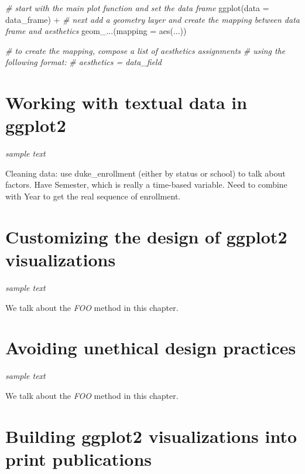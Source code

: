 \documentclass[
]{krantz}
\makeatletter
\newenvironment{Shaded}{\begin{snugshade}}{\end{snugshade}}
\newcommand{\AttributeTok}[1]{\textcolor[rgb]{0.61,0.61,0.61}{#1}}
\newcommand{\CommentTok}[1]{\textcolor[rgb]{0.37,0.37,0.37}{\textit{#1}}}
\newcommand{\FunctionTok}[1]{\textcolor[rgb]{0,0,0}{#1}}
\newcommand{\NormalTok}[1]{#1}
\newcommand{\SpecialCharTok}[1]{\textcolor[rgb]{0,0,0}{#1}}
\newenvironment{kframe}{%
\medskip{}
\setlength{\fboxsep}{.8em}
 \def\at@end@of@kframe{}%
 \ifinner\ifhmode%
  \def\at@end@of@kframe{\end{minipage}}%
  \begin{minipage}{\columnwidth}%
 \fi\fi%
 \def\FrameCommand##1{\hskip\@totalleftmargin \hskip-\fboxsep
 \colorbox{shadecolor}{##1}\hskip-\fboxsep
     \hskip-\linewidth \hskip-\@totalleftmargin \hskip\columnwidth}%
 \MakeFramed {\advance\hsize-\width
   \@totalleftmargin\z@ \linewidth\hsize
   \@setminipage}}%
 {\par\unskip\endMakeFramed%
 \at@end@of@kframe}
\renewenvironment{Shaded}{\begin{kframe}}{\end{kframe}}
\makeatother
\begin{document}
\begin{Shaded}
\begin{Highlighting}[]
\CommentTok{\# start with the main plot function and set the data frame}
\FunctionTok{ggplot}\NormalTok{(}\AttributeTok{data =}\NormalTok{ data\_frame) }\SpecialCharTok{+} 
\CommentTok{\# next add a geometry layer and create the mapping between data frame and aesthetics}
  \FunctionTok{geom\_...}\NormalTok{(}\AttributeTok{mapping =} \FunctionTok{aes}\NormalTok{(...))}

\CommentTok{\# to create the mapping, compose a list of aesthetics assignments }
\CommentTok{\# using the following format:}
\CommentTok{\#   aesthetics = data\_field}
\end{Highlighting}
\end{Shaded}

\hypertarget{text-data-visualizations}{%
\chapter{Working with textual data in ggplot2}\label{text-data-visualizations}}

\emph{sample text}

Cleaning data: use duke\_enrollment (either by status or school) to talk about factors.
Have Semester, which is really a time-based variable. Need to combine with Year
to get the real sequence of enrollment.

\hypertarget{customizing-visualization-design}{%
\chapter{Customizing the design of ggplot2 visualizations}\label{customizing-visualization-design}}

\emph{sample text}

We talk about the \emph{FOO} method in this chapter.

\hypertarget{ethical-design-practices}{%
\chapter{Avoiding unethical design practices}\label{ethical-design-practices}}

\emph{sample text}

We talk about the \emph{FOO} method in this chapter.

\hypertarget{print-publications}{%
\chapter{Building ggplot2 visualizations into print publications}\label{print-publications}}
\end{document}
